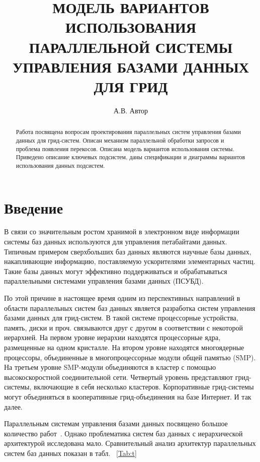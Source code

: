 \documentclass[11pt,oneside]{article}
\begin{document}
	\newcommand{\phan}{\hspace*{0cm}}
	\newcommand{\comment}{}

	\author{А.В. Автор}
	\title{МОДЕЛЬ ВАРИАНТОВ ИСПОЛЬЗОВАНИЯ ПАРАЛЛЕЛЬНОЙ СИСТЕМЫ УПРАВЛЕНИЯ БАЗАМИ ДАННЫХ ДЛЯ ГРИД}
	\maketitle{}

	\begin{abstract}
		Работа посвящена вопросам проектирования параллельных систем управления базами данных для грид-систем. Описан механизм параллельной обработки запросов и проблема появления перекосов. Описана модель вариантов использования системы. Приведено описание ключевых подсистем, даны спецификации и диаграммы вариантов использования данных подсистем.
	\end{abstract}


	
	\section*{Введение}
	\par В связи со значительным ростом хранимой в электронном виде информации системы баз данных используются для управления петабайтами данных. Типичным примером сверхбольших баз данных являются научные базы данных, накапливающие информацию, поставляемую ускорителями элементарных частиц. Такие базы данных могут эффективно поддерживаться и обрабатываться параллельными системами управления базами данных (ПСУБД).
	\par По этой причине в настоящее время одним из перспективных направлений в области параллельных систем баз данных является разработка систем управления базами данных для грид-систем. В такой системе процессорные устройства, память, диски и проч. связываются друг с другом в соответствии с некоторой иерархией. На первом уровне иерархии находятся процессорные ядра, размещенные на одном кристалле. На втором уровне находятся многоядерные процессоры, объединенные в многопроцессорные модули общей памятью (SMP). На третьем уровне SMP-модули объединяются в кластер с помощью высокоскоростной соединительной сети. Четвертый уровень представляют грид-системы, включающие в себя несколько кластеров. Корпоративные грид-системы могут объединяться в кооперативные грид-объединения на базе Интернет. И так далее.
	\par Параллельным системам управления базами данных посвящено большое количество работ~\cite{B_Gray2005, B_Mehta1997, B_Williams1998}. Однако проблематика систем баз данных с иерархической архитектурой исследована мало. Сравнительный анализ архитектур параллельных систем баз данных показан в табл. ~\ref{Tab:t}
\end{document}
